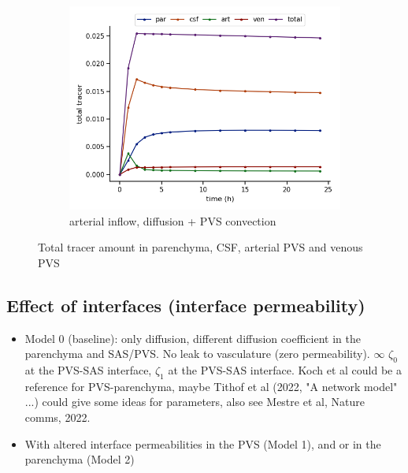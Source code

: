 \documentclass[fleqn,10pt]{wlscirep}
\begin{document}
\begin{figure}
     \begin{subfigure}[b]{0.33\textwidth}
         \centering
         \includegraphics[width=\textwidth]{paper/figures/modelC_total_conc.png}
         \caption{arterial inflow, diffusion + PVS convection}
         \label{fig:five over x}
     \end{subfigure}
        \caption{Total tracer amount in parenchyma, CSF, arterial PVS and venous PVS}
        \label{fig:three graphs}
\end{figure}


\subsection*{Effect of interfaces (interface permeability)}

\begin{itemize}
    \item Model 0 (baseline): only diffusion, different diffusion coefficient in the parenchyma and SAS/PVS. No leak to vasculature (zero permeability). $\infty$ $\zeta_0$ at the PVS-SAS interface, $\zeta_1$ at the PVS-SAS interface. Koch et al could be a reference for PVS-parenchyma, maybe Tithof et al (2022, "A network model" ...) could give some ideas for parameters, also see Mestre et al, Nature comms, 2022. 
    \item 
    With altered interface permeabilities in the PVS (Model 1), and or in the parenchyma (Model 2) 
    \end{itemize}

\begin{figure}
    \caption{}
    \label{fig:1}
\end{figure}
\end{document}
